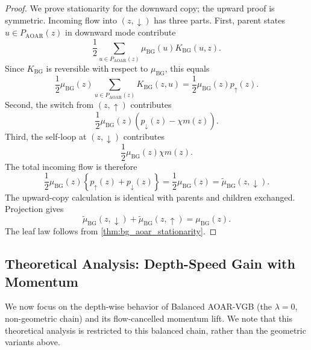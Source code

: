 \documentclass{article}
\numberwithin{theorem}{section}
\numberwithin{proposition}{section}
\numberwithin{corollary}{section}
\numberwithin{lemma}{section}
\numberwithin{conjecture}{section}
\numberwithin{remark}{section}
\numberwithin{definition}{section}
\numberwithin{assumption}{section}
\numberwithin{example}{section}
\newcommand{\mbra}[1]{\left\{#1\right\}}
\begin{document}
\begin{proof}
We prove stationarity for the downward copy; the upward proof is symmetric. Incoming flow into $(z,\downarrow)$ has three parts. First, parent states $u\in P_{\mathrm{AOAR}}(z)$ in downward mode contribute
\begin{equation*}
    \frac12\sum_{u\in P_{\mathrm{AOAR}}(z)}
    \mu_{\mathrm{BG}}(u)K_{\mathrm{BG}}(u,z).
\end{equation*}
Since $K_{\mathrm{BG}}$ is reversible with respect to $\mu_{\mathrm{BG}}$, this equals
\begin{equation*}
    \frac12\mu_{\mathrm{BG}}(z)
    \sum_{u\in P_{\mathrm{AOAR}}(z)}K_{\mathrm{BG}}(z,u)
    =
    \frac12\mu_{\mathrm{BG}}(z)p_{\uparrow}(z).
\end{equation*}
Second, the switch from $(z,\uparrow)$ contributes
\begin{equation*}
    \frac12\mu_{\mathrm{BG}}(z)(p_{\downarrow}(z)-\chi m(z)).
\end{equation*}
Third, the self-loop at $(z,\downarrow)$ contributes
\begin{equation*}
    \frac12\mu_{\mathrm{BG}}(z)\chi m(z).
\end{equation*}
The total incoming flow is therefore
\begin{equation*}
    \frac12\mu_{\mathrm{BG}}(z)\mbra{p_{\uparrow}(z)+p_{\downarrow}(z)}
    =
    \frac12\mu_{\mathrm{BG}}(z)
    =
    \widetilde\mu_{\mathrm{BG}}(z,\downarrow).
\end{equation*}
The upward-copy calculation is identical with parents and children exchanged. Projection gives
\begin{equation*}
    \widetilde\mu_{\mathrm{BG}}(z,\downarrow)+
    \widetilde\mu_{\mathrm{BG}}(z,\uparrow)
    =
    \mu_{\mathrm{BG}}(z).
\end{equation*}
The leaf law follows from \cref{thm:bg_aoar_stationarity}.
\end{proof}

\subsection{Theoretical Analysis: Depth-Speed Gain with Momentum}
\label{app:subsec:momentum_balanced_mixing_speed_gain}

We now focus on the depth-wise behavior of Balanced AOAR-VGB (the $\lambda=0$, non-geometric chain) and its flow-cancelled momentum lift. We note that this theoretical analysis is restricted to this balanced chain, rather than the geometric variants above.
\end{document}
